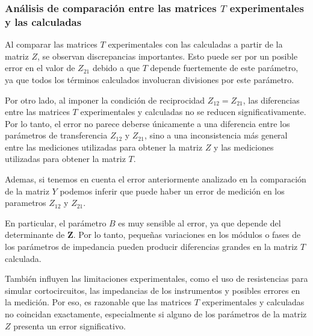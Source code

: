 \subsubsection{Análisis de comparación entre las matrices $T$ experimentales y las calculadas}

Al comparar las matrices $T$ experimentales con las calculadas a partir de la matriz $Z$, se observan discrepancias importantes. Esto puede ser por un posible error en el valor de $Z_{21}$ debido a que $T$ depende fuertemente de este parámetro, ya que todos los términos calculados involucran divisiones por este parámetro.

Por otro lado, al imponer la condición de reciprocidad $Z_{12}=Z_{21}$, las diferencias entre las matrices $T$ experimentales y calculadas no se reducen significativamente. Por lo tanto, el error no parece deberse únicamente a una diferencia entre los parámetros de transferencia $Z_{12}$ y $Z_{21}$, sino a una inconsistencia más general entre las mediciones utilizadas para obtener la matriz $Z$ y las mediciones utilizadas para obtener la matriz $T$.

Ademas,  si tenemos en cuenta el error anteriormente analizado en la comparación de la matriz $Y$ podemos inferir que puede haber un error de medición en los parametros $Z_{12}$ y $Z_{21}$.

En particular, el parámetro $B$ es muy sensible al error, ya que depende del determinante de $\mathbf{Z}$. Por lo tanto, pequeñas variaciones en los módulos o fases de los parámetros de impedancia pueden producir diferencias grandes en la matriz $T$ calculada.

También influyen las limitaciones experimentales, como el uso de resistencias para simular cortocircuitos, las impedancias de los instrumentos y posibles errores en la medición. Por eso, es razonable que las matrices $T$ experimentales y calculadas no coincidan exactamente, especialmente si alguno de los parámetros de la matriz $Z$ presenta un error significativo.
